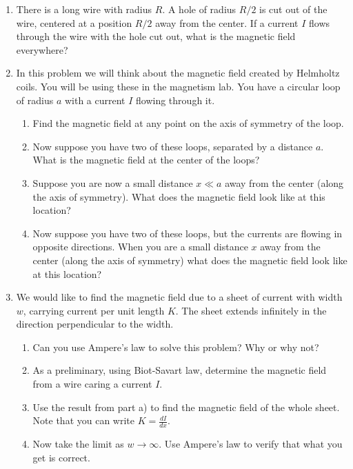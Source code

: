 \documentclass[12pt]{book}
\begin{document}
\begin{enumerate}
\item There is a long wire with radius $R.$ A hole of radius $R/2$ is cut out of the wire, centered at a position $R/2$ away from the center. If a current $I$ flows through the wire with the hole cut out, what is the magnetic field everywhere?
  \item In this problem we will think about the magnetic field created by Helmholtz coils. You will be using these in the magnetism lab. You have a circular loop of radius $a$ with a current $I$ flowing through it.
  \begin{enumerate}
   \item Find the magnetic field at any point on the axis of symmetry of the loop.
   \item Now suppose you have two of these loops, separated by a distance $a.$ What is the magnetic field at the center of the loops?
   \item Suppose you are now a small distance $x\ll a$ away from the center (along the axis of symmetry). What does the magnetic field look like at this location?
   \item Now suppose you have two of these loops, but the currents are flowing in opposite directions. When you are a small distance $x$ away from the center (along the axis of symmetry) what does the magnetic field look like at this location?
  \end{enumerate}
  \item We would like to find the magnetic field due to a sheet of current with width $w$, carrying current per unit length $K$. The sheet extends infinitely in the direction perpendicular to the width.
  \begin{enumerate}
  \item Can you use Ampere's law to solve this problem? Why or why not?
  \item As a preliminary, using Biot-Savart law, determine the magnetic field from a wire caring a current $I.$
  \item Use the result from part a) to find the magnetic field of the whole sheet. Note that you can write $K = \frac{dI}{dx}.$
  \item Now take the limit as $w\to\infty.$ Use Ampere's law to verify that what you get is correct.
  \end{enumerate}
  
  \pagebreak
  

\end{enumerate}
\end{document}

